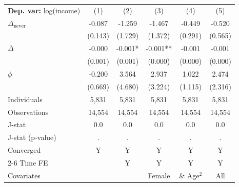 \begin{tabular}{l ccccc} \toprule  \textbf{Dep. var:}  log(income) 
                    &\multicolumn{1}{c}{(1)}   &\multicolumn{1}{c}{(2)}   &\multicolumn{1}{c}{(3)}   &\multicolumn{1}{c}{(4)}   &\multicolumn{1}{c}{(5)}   \\

\addlinespace
$\Delta_{\text{never}}$&      -0.087   &      -1.259   &      -1.467   &      -0.449   &      -0.520   \\
                    &     (0.143)   &     (1.729)   &     (1.372)   &     (0.291)   &     (0.565)   \\

\addlinespace
$\bar{\Delta}$      &      -0.000   &      -0.001*  &      -0.001** &      -0.001   &      -0.001   \\
                    &     (0.001)   &     (0.001)   &     (0.000)   &     (0.000)   &     (0.000)   \\

\addlinespace
$\phi$              &      -0.200   &       3.564   &       2.937   &       1.022   &       2.474   \\
                    &     (0.669)   &     (4.680)   &     (3.224)   &     (1.115)   &     (2.316)   \\
\addlinespace
Individuals         &       5,831   &       5,831   &       5,831   &       5,831   &       5,831   \\
Observations        &      14,554   &      14,554   &      14,554   &      14,554   &      14,554   \\
J-stat              &         0.0   &         0.0   &         0.0   &         0.0   &         0.0   \\
J-stat (p-value)    &           .   &           .   &           .   &           .   &           .   \\
Converged           &           Y   &           Y   &           Y   &           Y   &           Y   \\
\cmidrule{2-6} Time FE & & Y & Y & Y & Y \\ Covariates & & & Female & \& Age$^2$ & All \\ \bottomrule \end{tabular}

